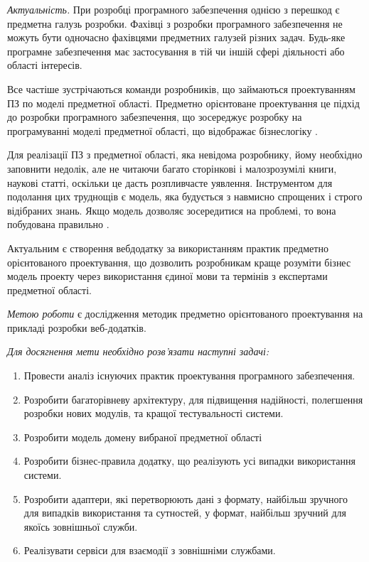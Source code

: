 
\emph{Актуальність.} При розробці програмного забезпечення однією з перешкод
є предметна галузь розробки. Фахівці з розробки програмного забезпечення
не можуть бути одночасно фахівцями предметних галузей різних задач.
Будь-яке програмне забезпечення має застосування в
тій чи іншій сфері діяльності або області інтересів.

Все частіше зустрічаються команди розробників, що займаються проектуванням
ПЗ по моделі предметної області. Предметно орієнтоване проектування це
підхід до розробки програмного забезпечення, що зосереджує розробку
на програмуванні моделі предметної області, що відображає бізнес­логіку 
\cite{ddd-evans, ddd-article, agile-book, scrum-guide, os-development, scrum-book}.

Для реалізації ПЗ з предметної області, яка невідома розробнику,
йому необхідно заповнити недолік, але не читаючи багато сторінкові
і малозрозумілі книги, наукові статті, оскільки це дасть розпливчасте уявлення.
Інструментом для подолання цих труднощів є модель,
яка будується з навмисно спрощених і строго відібраних знань.
Якщо модель дозволяє зосередитися на проблемі, то вона побудована правильно 
\cite{ddd-evans, ddd-article, agile-book, os-development}.

Актуальним є створення веб­додатку за використанням практик предметно орієнтованого проектування,
що дозволить розробникам краще розуміти бізнес модель проекту через використання
єдиної мови та термінів з експертами предметної області.

\emph{Метою роботи} є дослідження методик предметно орієнтованого проектування
на прикладі розробки веб-додатків.

\textit{Для досягнення мети необхідно розв'язати наступні задачі:}

\begin{enumerate}
  \item Провести аналіз існуючих практик проектування програмного забезпечення.
	\item Розробити багаторівневу архітектуру, для підвищення надійності,
		полегшення розробки нових модулів, та кращої тестувальності системи.
	\item Розробити модель домену вибраної предметної області
	\item Розробити бізнес-правила додатку, що реалізують усі випадки
		використання системи.
	\item Розробити адаптери, які перетворюють дані з формату,
		найбільш зручного для випадків використання та сутностей,
		у формат, найбільш зручний для якоїсь зовнішньої служби.
	\item Реалізувати сервіси для взаємодії з зовнішніми службами.
\end{enumerate}

